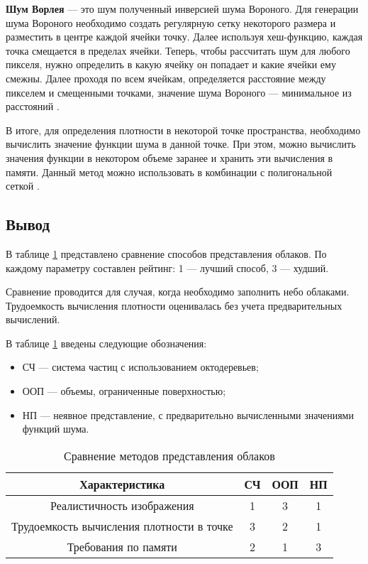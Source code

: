 \textbf{Шум Ворлея} --- это шум полученный инверсией шума Вороного. Для генерации шума Вороного необходимо создать регулярную сетку некоторого размера и разместить в центре каждой ячейки точку. Далее используя хеш-функцию, каждая точка смещается в пределах ячейки. Теперь, чтобы рассчитать шум для любого пикселя, нужно определить в какую ячейку он попадает и какие ячейки ему смежны. Далее проходя по всем ячейкам, определяется расстояние между пикселем и смещенными точками, значение шума Вороного --- минимальное из расстояний \cite{worley}. 

В итоге, для определения плотности в некоторой точке пространства, необходимо вычислить значение функции шума в данной точке. При этом, можно вычислить значения функции в некотором объеме заранее и хранить эти вычисления в памяти. Данный метод можно использовать в комбинации с полигональной сеткой \cite{implicit, hzd, frostbite, clouds}.


\subsection*{Вывод}

В таблице \ref{tbl:repr_choice} представлено сравнение способов представления облаков. По каждому параметру составлен рейтинг: 1 --- лучший способ, 3 --- худший.

Сравнение проводится для случая, когда необходимо заполнить небо облаками. Трудоемкость вычисления плотности оценивалась без учета предварительных вычислений.

В таблице \ref{tbl:repr_choice} введены следующие обозначения:
\begin{itemize}
	\item СЧ --- система частиц с использованием октодеревьев;
	\item ООП --- объемы, ограниченные поверхностью;
	\item НП --- неявное представление, с предварительно вычисленными значениями функций шума.
\end{itemize} 

\begin{table}[h]
	\begin{center}
		\begin{threeparttable}
			\captionsetup{justification=raggedright,singlelinecheck=off}
			\caption{Сравнение методов представления облаков}
			\label{tbl:repr_choice}
			\begin{tabular}{|c|c|c|c|}
				\hline
				Характеристика &  СЧ  & ООП & НП \\
				\hline
				Реалистичность изображения &  1  & 3 & 1 \\
				\hline
				Трудоемкость вычисления плотности в точке &  3  & 2 & 1 \\
				\hline
				Требования по памяти & 2 & 1 & 3 \\
				\hline
			\end{tabular}
		\end{threeparttable}
	\end{center}
\end{table}

